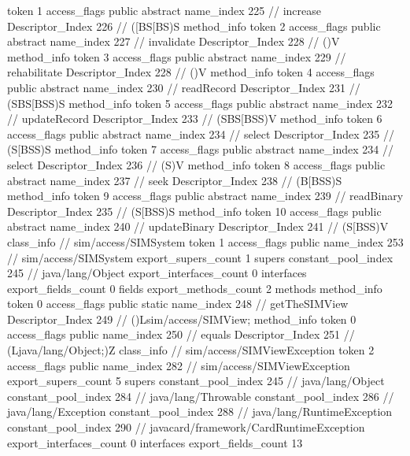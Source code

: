 {{{{{					token	1
					access_flags	public abstract
					name_index	225		// increase
					Descriptor_Index	226		// ([BS[BS)S
				}
				method_info {
					token	2
					access_flags	public abstract
					name_index	227		// invalidate
					Descriptor_Index	228		// ()V
				}
				method_info {
					token	3
					access_flags	public abstract
					name_index	229		// rehabilitate
					Descriptor_Index	228		// ()V
				}
				method_info {
					token	4
					access_flags	public abstract
					name_index	230		// readRecord
					Descriptor_Index	231		// (SBS[BSS)S
				}
				method_info {
					token	5
					access_flags	public abstract
					name_index	232		// updateRecord
					Descriptor_Index	233		// (SBS[BSS)V
				}
				method_info {
					token	6
					access_flags	public abstract
					name_index	234		// select
					Descriptor_Index	235		// (S[BSS)S
				}
				method_info {
					token	7
					access_flags	public abstract
					name_index	234		// select
					Descriptor_Index	236		// (S)V
				}
				method_info {
					token	8
					access_flags	public abstract
					name_index	237		// seek
					Descriptor_Index	238		// (B[BSS)S
				}
				method_info {
					token	9
					access_flags	public abstract
					name_index	239		// readBinary
					Descriptor_Index	235		// (S[BSS)S
				}
				method_info {
					token	10
					access_flags	public abstract
					name_index	240		// updateBinary
					Descriptor_Index	241		// (S[BSS)V
				}
			}
		}
		class_info {		// sim/access/SIMSystem
			token	1
			access_flags	public
			name_index	253		// sim/access/SIMSystem
			export_supers_count	1
			supers {
				constant_pool_index	245		// java/lang/Object
			}
			export_interfaces_count	0
			interfaces {
			}
			export_fields_count	0
			fields {
			}
			export_methods_count	2
			methods {
				method_info {
					token	0
					access_flags	public static
					name_index	248		// getTheSIMView
					Descriptor_Index	249		// ()Lsim/access/SIMView;
				}
				method_info {
					token	0
					access_flags	public
					name_index	250		// equals
					Descriptor_Index	251		// (Ljava/lang/Object;)Z
				}
			}
		}
		class_info {		// sim/access/SIMViewException
			token	2
			access_flags	public
			name_index	282		// sim/access/SIMViewException
			export_supers_count	5
			supers {
				constant_pool_index	245		// java/lang/Object
				constant_pool_index	284		// java/lang/Throwable
				constant_pool_index	286		// java/lang/Exception
				constant_pool_index	288		// java/lang/RuntimeException
				constant_pool_index	290		// javacard/framework/CardRuntimeException
			}
			export_interfaces_count	0
			interfaces {
			}
			export_fields_count	13
}}}
